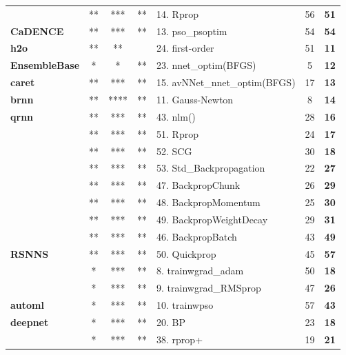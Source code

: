 \begin{Schunk}
\begin{table}
\begin{tabular}[t]{>{}lccclc>{}c}
 & ** & *** & ** & 14. Rprop & 56 & \textbf{51}\\

\multirow{-3}{*}{\raggedright\arraybackslash \textbf{CaDENCE}} & ** & *** & ** & 13. pso\_psoptim & 54 & \textbf{54}\\
\cmidrule{1-7}
\textbf{h2o} & ** & ** &  & 24. first-order & 51 & \textbf{11}\\
\cmidrule{1-7}
\textbf{EnsembleBase} & * & * & ** & 23. nnet\_optim(BFGS) & 5 & \textbf{12}\\
\cmidrule{1-7}
\textbf{caret} & ** & *** & ** & 15. avNNet\_nnet\_optim(BFGS) & 17 & \textbf{13}\\
\cmidrule{1-7}
\textbf{brnn} & ** & **** & ** & 11. Gauss-Newton & 8 & \textbf{14}\\
\cmidrule{1-7}
\textbf{qrnn} & ** & *** & ** & 43. nlm() & 28 & \textbf{16}\\
\cmidrule{1-7}
 & ** & *** & ** & 51. Rprop & 24 & \textbf{17}\\

 & ** & *** & ** & 52. SCG & 30 & \textbf{18}\\

 & ** & *** & ** & 53. Std\_Backpropagation & 22 & \textbf{27}\\

 & ** & *** & ** & 47. BackpropChunk & 26 & \textbf{29}\\

 & ** & *** & ** & 48. BackpropMomentum & 25 & \textbf{30}\\

 & ** & *** & ** & 49. BackpropWeightDecay & 29 & \textbf{31}\\

 & ** & *** & ** & 46. BackpropBatch & 43 & \textbf{49}\\

\multirow{-8}{*}{\raggedright\arraybackslash \textbf{RSNNS}} & ** & *** & ** & 50. Quickprop & 45 & \textbf{57}\\
\cmidrule{1-7}
 & * & *** & ** & 8. trainwgrad\_adam & 50 & \textbf{18}\\

 & * & *** & ** & 9. trainwgrad\_RMSprop & 47 & \textbf{26}\\

\multirow{-3}{*}{\raggedright\arraybackslash \textbf{automl}} & * & *** & ** & 10. trainwpso & 57 & \textbf{43}\\
\cmidrule{1-7}
\textbf{deepnet} & * & *** & ** & 20. BP & 23 & \textbf{18}\\
\cmidrule{1-7}
 & * & *** & ** & 38. rprop+ & 19 & \textbf{21}\\


\end{tabular}
\end{table}
\end{Schunk}
